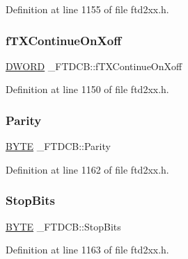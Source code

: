 Definition at line 1155 of file ftd2xx.\+h.

\mbox{\label{struct__FTDCB_afa27d3f28cd9154df261cd643df33497}} 
\subsubsection{\texorpdfstring{f\+T\+X\+Continue\+On\+Xoff}{fTXContinueOnXoff}}
{\footnotesize\ttfamily \hyperlink{CatCaloProto40MHz_2inc_2WinTypes_8h_ad342ac907eb044443153a22f964bf0af}{D\+W\+O\+RD} \+\_\+\+F\+T\+D\+C\+B\+::f\+T\+X\+Continue\+On\+Xoff}



Definition at line 1150 of file ftd2xx.\+h.

\mbox{\label{struct__FTDCB_aecaa6eb87d7725f655138a6a6c04c436}} 
\subsubsection{\texorpdfstring{Parity}{Parity}}
{\footnotesize\ttfamily \hyperlink{CatCaloProto40MHz_2inc_2WinTypes_8h_a4ae1dab0fb4b072a66584546209e7d58}{B\+Y\+TE} \+\_\+\+F\+T\+D\+C\+B\+::\+Parity}



Definition at line 1162 of file ftd2xx.\+h.

\mbox{\label{struct__FTDCB_a26a8414df8e94f282714833f9776319a}} 
\subsubsection{\texorpdfstring{Stop\+Bits}{StopBits}}
{\footnotesize\ttfamily \hyperlink{CatCaloProto40MHz_2inc_2WinTypes_8h_a4ae1dab0fb4b072a66584546209e7d58}{B\+Y\+TE} \+\_\+\+F\+T\+D\+C\+B\+::\+Stop\+Bits}



Definition at line 1163 of file ftd2xx.\+h.

